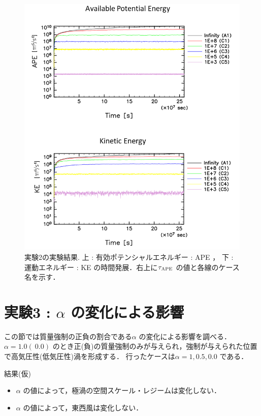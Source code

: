 \documentclass[a4j,12pt,openbib,oneside]{jreport}
\begin{document}
\begin{figure}[ht]
  \begin{center}
    \includegraphics[clip,width=12cm]{./fig/result/case2/case2_apeke.png}
    \caption{
      \footnotesize{実験2の実験結果. 上 : 有効ポテンシャルエネルギー : APE ，
下 : 運動エネルギー : KE の時間発展．右上に$\tau_{\rm{APE}}$ の値と各線のケース名を示す．
      }
    }
    \label{fig:case2_apeke}
  \end{center}
\end{figure}

\clearpage
\newpage
\section{実験3 : {$\alpha$} の変化による影響}
\label{sec:case3}
この節では質量強制の正負の割合である$\alpha$ の変化による影響を調べる．
$\alpha = 1.0 (~0.0)$ のとき正(負)の質量強制のみが与えられ，強制が与えられた位置で高気圧性(低気圧性)渦を形成する．
行ったケースは$\alpha = 1, 0.5, 0.0$ である．

結果(仮)
\begin{itemize}
\item{$\alpha$ の値によって，極渦の空間スケール・レジームは変化しない．}
\item{$\alpha$ の値によって，東西風は変化しない．}
\end{itemize}
%
\end{document}
